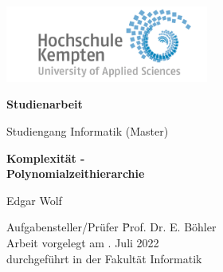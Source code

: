 \thispagestyle{empty}



\vspace*{-20mm}
\begin{flushright}
\includegraphics[width=0.5\textwidth]{Bilder/LogoHS.png}
\end{flushright}


\vspace*{2cm}

\begin{center}
{\Large \textbf{Studienarbeit}}\\ 

\vspace*{1cm}

{\large Studiengang Informatik (Master)\\[1mm]}

\vspace{1cm}

{\Large \bfseries Komplexität - \\ Polynomialzeithierarchie}


\vspace{1.5cm}

{\large Edgar Wolf}\\[40mm]

\end{center}

\vfill

\parbox{120mm}{
\begin{tabbing}
Aufgabensteller/Prüfer \hspace{.7cm} \= Prof. Dr. E. Böhler\\
Arbeit vorgelegt am                  . Juli 2022\\
durchgeführt in der                  \> Fakultät Informatik\\[4mm]
\end{tabbing}
}

